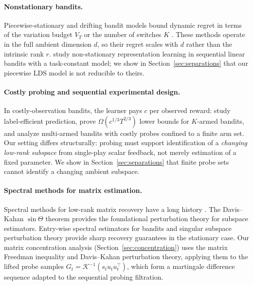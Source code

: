 \documentclass[12pt]{article}
\theoremstyle{plain}
\theoremstyle{definition}
\begin{document}
\paragraph{Nonstationary bandits.}
Piecewise-stationary and drifting bandit models bound dynamic regret in terms of the variation budget $V_T$ or the number of switches $K$ \citep{russac2019weighted, cheung2019learning, auer2019adaptively}.
These methods operate in the full ambient dimension $d$, so their regret scales with $d$ rather than the intrinsic rank $r$.
\citet{qin2022nonstationary} study non-stationary representation learning in sequential linear bandits with a task-constant model; we show in Section~\ref{sec:separations} that our piecewise LDS model is not reducible to theirs.

\paragraph{Costly probing and sequential experimental design.}
In costly-observation bandits, the learner pays $c$ per observed reward: \citet{seldin2014paid} study label-efficient prediction, \citet{tucker2023costly} prove $\Omega(c^{1/3}T^{2/3})$ lower bounds for $K$-armed bandits, and \citet{elumar2025costly} analyze multi-armed bandits with costly probes confined to a finite arm set.
Our setting differs structurally: probing must support identification of a \emph{changing low-rank subspace} from single-play scalar feedback, not merely estimation of a fixed parameter.
We show in Section~\ref{sec:separations} that finite probe sets cannot identify a changing ambient subspace.

\paragraph{Spectral methods for matrix estimation.}
Spectral methods for low-rank matrix recovery have a long history \citep{johnstone2009consistency, vu2013minimax, cai2013sparse}. The Davis--Kahan $\sin\Theta$ theorem \citep{davis1970rotation, yu2015useful} provides the foundational perturbation theory for subspace estimators. Entry-wise spectral estimators for bandits \citep{stojanovic2023spectral} and singular subspace perturbation theory \citep{pmlr-v235-jedra24a} provide sharp recovery guarantees in the stationary case. Our matrix concentration analysis (Section~\ref{sec:concentration}) uses the matrix Freedman inequality \citep{tropp2012user} and Davis--Kahan perturbation theory, applying them to the lifted probe samples $G_t = \mathcal{K}^{-1}(s_t u_t u_t^\top)$, which form a martingale difference sequence adapted to the sequential probing filtration.
\end{document}
